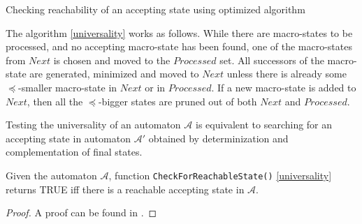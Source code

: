 \begin{algorithm}[ht!]
		\BlankLine
		\BlankLine
		\caption{Checking reachability of an
		accepting state using optimized algorithm\cite{tacas}}\label{universality}
	\end{algorithm}
	
The algorithm \ref{universality} works as follows. While there are macro-states
to be processed, and no accepting macro-state has been found, one of the macro-states from $Next$
is chosen and moved to the $Processed$ set. All successors of the macro-state are
generated, minimized and moved to $Next$ unless there is already some
$\preceq$-smaller macro-state in $Next$ or in $Processed$. If a
new macro-state is added to $Next$, then all the
$\preceq$-bigger states are pruned out of both $Next$ and
$Processed$.

Testing the universality of an automaton $\mathcal{A}$ is equivalent to
searching for an accepting state in automaton $\mathcal{A}'$ obtained by
determinization and complementation of final states.
	
\begin{lemma}\label{search-is-correct}
 Given the automaton $\mathcal{A}$, function \texttt{CheckForReachableState()}
 \ref{universality} returns \textsc{TRUE} iff there is a reachable accepting
 state in $\mathcal{A}$.
\end{lemma}
\begin{proof}
 A proof can be found in \cite{raskin}.
\end{proof}

